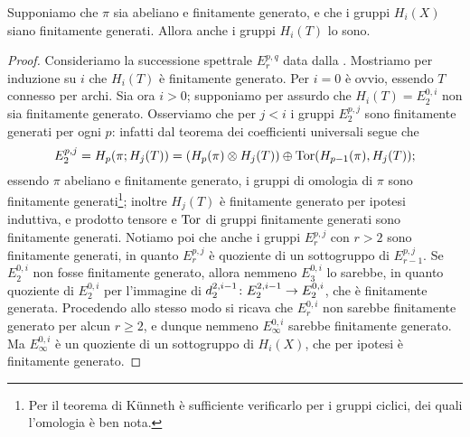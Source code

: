 \begin{proposition}
Supponiamo che $\pi$ sia abeliano e finitamente generato, e che i gruppi $H_i(X)$ siano finitamente generati. Allora anche i gruppi $H_i(T)$ lo sono.
\end{proposition}
\begin{proof}
Consideriamo la successione spettrale $E^{p,q}_r$ data dalla . Mostriamo per induzione su $i$ che $H_i(T)$ è finitamente generato. Per $i=0$ è ovvio, essendo $T$ connesso per archi. Sia ora $i>0$; supponiamo per assurdo che $H_i(T)=E^{0,i}_2$ non sia finitamente generato. Osserviamo che per $j<i$ i gruppi $E^{p,j}_2$ sono finitamente generati per ogni $p$: infatti dal teorema dei coefficienti universali segue che
$$
E^{p,j}_2=H_p(\pi;H_j(T))=(H_p(\pi)\mathbin{\otimes} H_j(T))\mathbin{\oplus}\operatorname{Tor}(H_{p-1}(\pi),H_j(T));
$$
essendo $\pi$ abeliano e finitamente generato, i gruppi di omologia di $\pi$ sono finitamente generati\footnote{Per il teorema di Künneth è sufficiente verificarlo per i gruppi ciclici, dei quali l'omologia è ben nota.}; inoltre $H_j(T)$ è finitamente generato per ipotesi induttiva, e prodotto tensore e $\operatorname{Tor}$ di gruppi finitamente generati sono finitamente generati. Notiamo poi che anche i gruppi $E^{p,j}_r$ con $r>2$ sono finitamente generati, in quanto $E^{p,j}_r$ è quoziente di un sottogruppo di $E^{p,j}_{r-1}$. Se $E^{0,i}_2$ non fosse finitamente generato, allora nemmeno $E^{0,i}_3$ lo sarebbe, in quanto quoziente di $E^{0,i}_2$ per l'immagine di $d^{2,i-1}_2\colon E^{2,i-1}_2\to E^{0,i}_2$, che è finitamente generata. Procedendo allo stesso modo si ricava che $E^{0,i}_r$ non sarebbe finitamente generato per alcun $r\ge 2$, e dunque nemmeno $E^{0,i}_\infty$ sarebbe finitamente generato. Ma $E^{0,i}_\infty$ è un quoziente di un sottogruppo di $H_i(X)$, che per ipotesi è finitamente generato.
\end{proof}